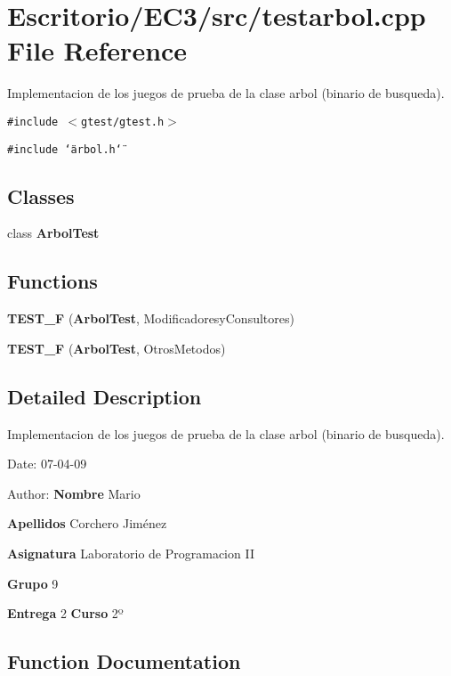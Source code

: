 \section{Escritorio/EC3/src/testarbol.cpp File Reference}
\label{testarbol_8cpp}
Implementacion de los juegos de prueba de la clase arbol (binario de busqueda). 

{\tt \#include $<$gtest/gtest.h$>$}\par
{\tt \#include \char`\"{}arbol.h\char`\"{}}\par
\subsection*{Classes}
\begin{CompactItemize}
\item 
class {\bf ArbolTest}
\end{CompactItemize}
\subsection*{Functions}
\begin{CompactItemize}
\item 
{\bf TEST\_\-F} ({\bf ArbolTest}, ModificadoresyConsultores)
\item 
{\bf TEST\_\-F} ({\bf ArbolTest}, OtrosMetodos)
\end{CompactItemize}


\subsection{Detailed Description}
Implementacion de los juegos de prueba de la clase arbol (binario de busqueda). 

\begin{Desc}
\item[Date:]07-04-09 \end{Desc}
\begin{Desc}
\item[Author:]{\bf Nombre} Mario \par
 {\bf Apellidos} Corchero Jiménez \par
 {\bf Asignatura} Laboratorio de Programacion II \par
 {\bf Grupo} 9 \par
 {\bf Entrega} 2 {\bf Curso} 2º \end{Desc}


\subsection{Function Documentation}
